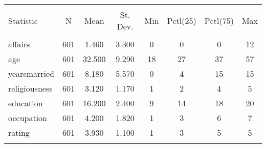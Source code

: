 
\begin{table}[!htbp] \centering 
  \caption{} 
  \label{} 
\begin{tabular}{@{\extracolsep{5pt}}lccccccc} 
\\[-1.8ex]\hline 
\hline \\[-1.8ex] 
Statistic & \multicolumn{1}{c}{N} & \multicolumn{1}{c}{Mean} & \multicolumn{1}{c}{St. Dev.} & \multicolumn{1}{c}{Min} & \multicolumn{1}{c}{Pctl(25)} & \multicolumn{1}{c}{Pctl(75)} & \multicolumn{1}{c}{Max} \\ 
\hline \\[-1.8ex] 
affairs & 601 & 1.460 & 3.300 & 0 & 0 & 0 & 12 \\ 
age & 601 & 32.500 & 9.290 & 18 & 27 & 37 & 57 \\ 
yearsmarried & 601 & 8.180 & 5.570 & 0 & 4 & 15 & 15 \\ 
religiousness & 601 & 3.120 & 1.170 & 1 & 2 & 4 & 5 \\ 
education & 601 & 16.200 & 2.400 & 9 & 14 & 18 & 20 \\ 
occupation & 601 & 4.200 & 1.820 & 1 & 3 & 6 & 7 \\ 
rating & 601 & 3.930 & 1.100 & 1 & 3 & 5 & 5 \\ 
\hline \\[-1.8ex] 
\end{tabular} 
\end{table} 
